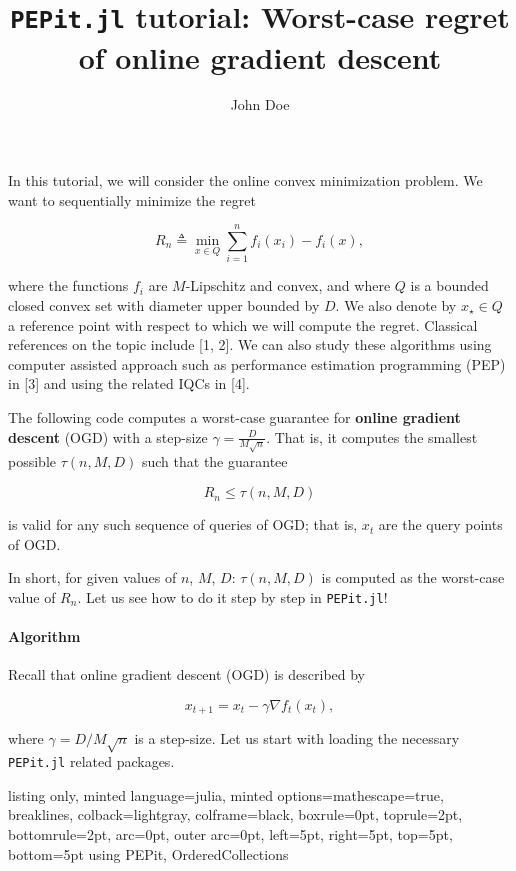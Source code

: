 \documentclass{article}
\title{\textbf{\textsf{\texttt{PEPit.jl} tutorial: Worst-case regret of online gradient descent}}}
\author{John Doe}
\begin{document}
    \maketitle
    
    

In this tutorial, we will consider the online convex minimization problem. We want to sequentially minimize the regret

\begin{equation*}
R_n \triangleq \min_{x\in Q} \sum_{i=1}^n f_i(x_i)-f_i(x),
\end{equation*}

where the functions $f_i$ are $M$-Lipschitz and convex, and where $Q$ is a bounded closed convex set with diameter upper bounded by $D$. We also denote by $x_\star\in Q$ a reference point with respect to which we will compute the regret.
Classical references on the topic include [1, 2]. We can also study these algorithms using computer assisted approach such as performance estimation programming (PEP) in [3] and using the related IQCs in [4].

The following code computes a worst-case guarantee for \textbf{online gradient descent} (OGD) with a step-size $\gamma=\frac{D}{M \sqrt{n}}$. That is, it computes the smallest possible $\tau(n, M, D)$ such that the guarantee

\begin{equation*}
R_n \leqslant \tau(n, M, D)
\end{equation*}

is valid for any such sequence of queries of OGD; that is, $x_t$ are the query points of OGD.

In short, for given values of $n$, $M$, $D$: 
$\tau(n, M, D)$ is computed as the worst-case value of $R_n$. Let us see how to do it step by step in \texttt{PEPit.jl}!

\paragraph{Algorithm}
Recall that online gradient descent (OGD) is described by

\begin{equation*}
x_{t+1} = x_t - \gamma \nabla f_t(x_t),
\end{equation*}

where $\gamma=D/M\sqrt{n}$ is a step-size.
Let us start with loading the necessary \texttt{PEPit.jl} related packages.

\begin{tcblisting}{listing only, minted language=julia, minted options={mathescape=true, breaklines}, colback=lightgray, colframe=black, boxrule=0pt, toprule=2pt, bottomrule=2pt, arc=0pt, outer arc=0pt, left=5pt, right=5pt, top=5pt, bottom=5pt}
using PEPit, OrderedCollections
\end{tcblisting}
\end{document}
